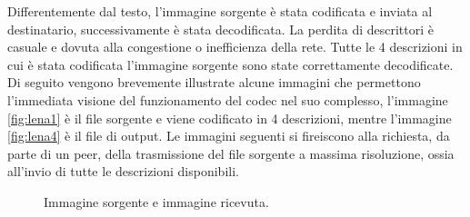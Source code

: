 Differentemente dal testo, l'immagine sorgente è stata codificata e
inviata al destinatario, successivamente è stata decodificata. La perdita di descrittori è casuale e dovuta alla congestione o inefficienza della rete. Tutte le 4 descrizioni in cui è stata codificata
l'immagine sorgente sono state correttamente decodificate. Di seguito vengono
brevemente illustrate alcune immagini che permettono l'immediata visione del
funzionamento del codec nel suo complesso, l'immagine \ref{fig:lena1} è il file
sorgente e viene codificato in 4 descrizioni, mentre l'immagine \ref{fig:lena4}
è il file di output. Le immagini seguenti si fireiscono alla richiesta, da parte
di un peer, della trasmissione del file sorgente a massima risoluzione, ossia all'invio di tutte le descrizioni disponibili.

\begin{figure}[t]
\centering
{}
	\caption{Immagine sorgente e immagine ricevuta.}
\end{figure}

